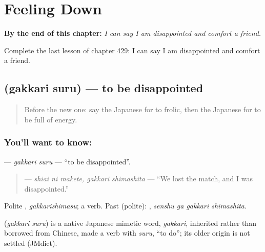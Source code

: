 
\chapter{Feeling Down}
\label{ch:ja-feeling-down}

\begin{chapteropening}
\textbf{By the end of this chapter:} \emph{I can say I am disappointed and comfort a friend.}

Complete the last lesson of chapter 429: I can say I am disappointed and comfort a friend.
\end{chapteropening}

\section[\texorpdfstring{\ja{がっかりする} (gakkari suru)}{がっかりする (gakkari suru)}]{ (gakkari suru) — to be disappointed}

\label{lesson:JA-C429-gakkari-suru}



\begin{quote}
Before the new one: say the Japanese for to frolic, then the Japanese for to be full of energy.
\end{quote}

\subsection*{You'll want to know: }
\textbf{} — \emph{gakkari suru} — \textquotedblleft{}to be disappointed\textquotedblright{}.

\begin{quote}
\textbf{ } — \emph{shiai ni makete, gakkari shimashita} — \textquotedblleft{}We lost the match, and I was disappointed.\textquotedblright{}
\end{quote}

Polite \textbf{}, \emph{gakkarishimasu}; a  verb. Past (polite): \textbf{ }, \emph{senshu ga gakkari shimashita}.

\begin{cousinweb}
\textbf{} (\emph{gakkari suru}) is a native Japanese mimetic word, \emph{gakkari}, inherited rather than borrowed from Chinese, made a verb with \emph{suru}, \textquotedblleft{}to do\textquotedblright{}; its older origin is not settled (JMdict).
\end{cousinweb}

